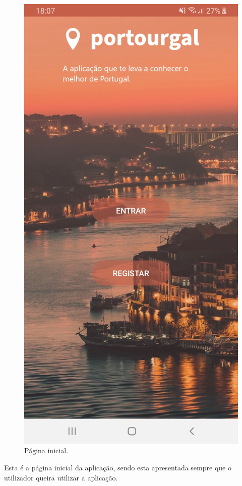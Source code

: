 \begin{figure}[H]
\centering
\includegraphics[width=0.3\linewidth]{images/inicio.jpg}
\caption{Página inicial.}
\end{figure}

Esta é a página inicial da aplicação, sendo esta apresentada sempre que o utilizador queira utilizar a aplicação.